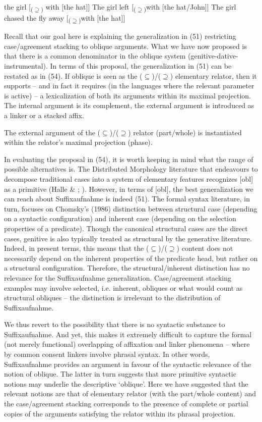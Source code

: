 \documentclass[output=paper]{langsci/langscibook}
\begin{document}
\ea%
    \label{ex:manzini:53}
    \ea  the girl [\textsubscript{($\supseteq$)} with [the hat]]
    \ex  The girl left [\textsubscript{($\supseteq$)}with [the hat/John]]
    \ex  The girl chased the fly away [\textsubscript{($\supseteq$)}with [the hat]]
    \z
\z
  
Recall that our goal here is explaining the generalization in (51) restricting case/agreement stacking to oblique arguments. What we have now proposed is that there is a common denominator in the oblique system (genitive-dative-instrumental). In terms of this proposal, the generalization in (51) can be restated as in (54). If oblique is seen as the ($\subseteq$)/($\supseteq$) elementary relator, then it supports – and in fact it requires (in the languages where the relevant parameter is active) – a lexicalization of both its arguments within its maximal projection. The internal argument is its complement, the external argument is introduced as a linker or a stacked affix.

\ea%
    \label{ex:manzini:54}
    The external argument of the ($\subseteq$)/($\supseteq$) relator (part/whole) is instantiated within the relator’s maximal projection (phase).
\z

In evaluating the proposal in (54), it is worth keeping in mind what the range of possible alternatives is. The Distributed Morphology literature that endeavours to decompose traditional cases into a system of elementary features recognizes [obl] as a primitive (Halle \& \citealt{Vaux1998}; \citealt{Calabrese2008}). However, in terms of [obl], the best generalization we can reach about Suffixaufnahme is indeed (51). The formal syntax literature, in turn, focuses on Chomsky’s (1986) distinction between structural case (depending on a syntactic configuration) and inherent case (depending on the selection properties of a predicate). Though the canonical structural cases are the direct cases, genitive is also typically treated as structural by the generative literature. Indeed, in present terms, this means that the ($\subseteq$)/($\supseteq$) content does not necessarily depend on the inherent properties of the predicate head, but rather on a structural configuration. Therefore, the structural/inherent distinction has no relevance for the Suffixaufnahme generalization. Case/agreement stacking examples may involve selected, i.e. inherent, obliques or what would count as structural obliques  – the distinction is irrelevant to the distribution of Suffixaufnahme. 

We thus revert to the possibility that there is no syntactic substance to Suffixaufnahme. And yet, this makes it extremely difficult to capture the formal (not merely functional) overlapping of affixation and linker phenomena – where by common consent linkers involve phrasal syntax. In other words, Suffixaufnahme provides an argument in favour of the syntactic relevance of the notion of oblique. The latter in turn suggests that more primitive syntactic notions may underlie the descriptive ‘oblique’. Here we have suggested that the relevant notions are that of elementary relator (with the part/whole content) and the case/agreement stacking corresponds to the presence of complete or partial copies of the arguments satisfying the relator within its phrasal projection. 
\end{document}
